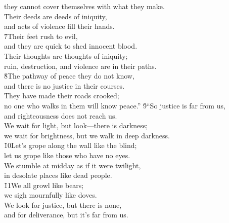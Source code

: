 \begin{poetry}
\poemll    they cannot cover themselves with what they make. \\
\poeml Their deeds are deeds of iniquity, \\
\poemll    and acts of violence fill their hands. \\
\poeml \v{7}Their feet rush to evil, \\
\poemll    and they are quick to shed innocent blood. \\
\poeml Their thoughts are thoughts of iniquity; \\
\poemll    ruin, destruction, and violence are in their paths. \\
\poeml \v{8}The pathway of peace they do not know, \\
\poemll    and there is no justice in their courses. \\
\poeml They have made their roads crooked; \\
\poemll    no one who walks in them will know peace.''
\poeml \v{9}``So justice is far from us, \\
\poemll    and righteousness does not reach us. \\
\poeml We wait for light, but look---there is darkness; \\
\poemll    we wait for brightness, but we walk in deep darkness. \\
\poeml \v{10}Let's grope along the wall like the blind; \\
\poemll    let us grope like those who have no eyes. \\
\poeml We stumble at midday as if it were twilight, \\
\poemll    in desolate places like dead people. \\
\poeml \v{11}We all growl like bears; \\
\poemll    we sigh mournfully like doves. \\
\poeml We look for justice, but there is none, \\
\poemll    and for deliverance, but it's far from us. \\

\end{poetry}
